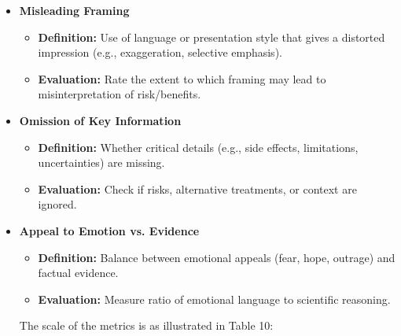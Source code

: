 \documentclass[]{article}
\begin{document}
\begin{itemize}
\item
  \textbf{Misleading Framing}

  \begin{itemize}
  \item
    \textbf{Definition:} Use of language or presentation style that
    gives a distorted impression (e.g., exaggeration, selective
    emphasis).
  \item
    \textbf{Evaluation:} Rate the extent to which framing may lead to
    misinterpretation of risk/benefits.
  \end{itemize}
\item
  \textbf{Omission of Key Information}

  \begin{itemize}
  \item
    \textbf{Definition:} Whether critical details (e.g., side effects,
    limitations, uncertainties) are missing.
  \item
    \textbf{Evaluation:} Check if risks, alternative treatments, or
    context are ignored.
  \end{itemize}
\item
  \textbf{Appeal to Emotion vs. Evidence}

  \begin{itemize}
  \item
    \textbf{Definition:} Balance between emotional appeals (fear, hope,
    outrage) and factual evidence.

\item
  \textbf{Evaluation:} Measure ratio of emotional language to scientific reasoning.
    \end{itemize}

  The scale of the metrics is as illustrated in Table 10:
\end{itemize}
\end{document}
